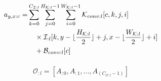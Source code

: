 \begin{align}
\label{eqn:elementwise_product}
\begin{split}
a_{y,x:c} =& \sum_{k=0}^{C_{\mathcal{I}:l} } \sum_{j=0}^{H_{\mathcal{K}:l}-1} \sum_{i=0}^{W_{\mathcal{K}:l}-1} \mathcal{K}_{conv:l}[c, k, j, i] \\
& \quad \times \mathcal{I}_{:l}[k,y-\lfloor\frac{H_{\mathcal{K}:l} }{2}\rfloor+j,x-\lfloor\frac{W_{\mathcal{K}:l} }{2}\rfloor+i] \\
& \quad + \mathcal{B}_{conv:l}[c]
\end{split}
\end{align}

\begin{align}
\label{eqn:conv_operator}
\begin{split}
\mathcal{O}_{:l} = [A_{:0}, A_{:1}, ... , A_{(C_{\mathcal{O}:l}-1)}]
\end{split}
\end{align}




